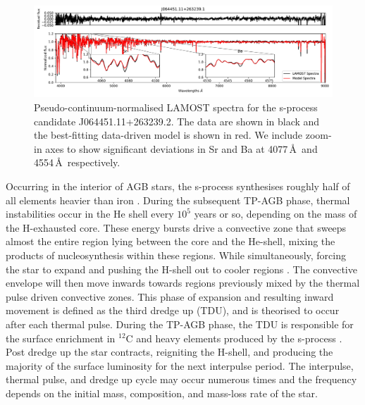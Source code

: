 \documentclass[a4paper,fleqn,usenatbib]{mnras}
\begin{document}
\begin{figure}
	\includegraphics[width=\textwidth]{posterchild_final.pdf}
	\caption{Pseudo-continuum-normalised LAMOST spectra for the s-process candidate J064451.11+263239.2. The data are shown in black and the best-fitting data-driven model is shown in red. We include zoom-in axes to show significant deviations in Sr and Ba at  4077\,\AA\ and 4554\,\AA\, respectively.}
	\label{fig:figure1}
\end{figure}

Occurring in the interior of AGB stars, the s-process synthesises roughly half of all elements heavier than iron \citep[e.g.,][]{busso1999,travaglio2001,herwig2005,bisterzo2014,karakas2014}. During the subsequent TP-AGB phase, thermal instabilities occur in the He shell every $10^5$ years or so, depending on the mass of the H-exhausted core. These energy bursts drive a convective zone that sweeps almost the entire region lying between the core and the He-shell, mixing the products of nucleosynthesis within these regions. While simultaneously, forcing the star to expand and pushing the H-shell out to cooler regions \citep{karakas2002}. The convective envelope will then move inwards towards regions previously mixed by the thermal pulse driven convective zones. This phase of expansion and resulting inward movement is defined as the third dredge up (TDU), and is theorised to occur after each thermal pulse. During the TP-AGB phase, the TDU is responsible for the surface enrichment in $^{12}$C and heavy elements produced by the s-process \citep[e.g.,][]{busso2001}. Post dredge up the star contracts, reigniting the H-shell, and producing the majority of the surface luminosity for the next interpulse period. The interpulse, thermal pulse, and dredge up cycle may occur numerous times and the frequency depends on the initial mass, composition, and mass-loss rate of the star.
\end{document}

